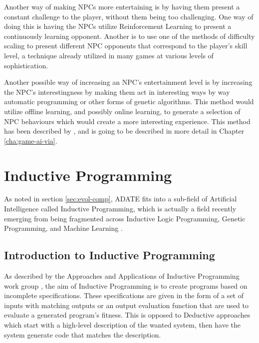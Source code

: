 \documentclass[]{report}
\begin{document}
Another way of making NPCs more entertaining is by having them present a
constant challenge to the player, without them being too challenging. One way of
doing this is having the NPCs utilize Reinforcement Learning
\citep{merrick2006motivated,sutton1998reinforcement} to present a continuously
learning opponent. Another is to use one of the methods of difficulty scaling to
present different NPC opponents that correspond to the player's skill level, a
technique already utilized in many games at various levels of sophistication.

Another possible way of increasing an NPC's entertainment level is by increasing
the NPC's interestingness by making them act in interesting ways by way
automatic programming or other forms of genetic algorithms. This method would
utilize offline learning, and possibly online learning, to generate a selection
of NPC behaviours which would create a more interesting experience. This method
has been described by \citet{yannakakis2005ai}, and is going to be described in
more detail in Chapter \ref{cha:game-ai-via}.

\chapter{Inductive Programming}
\label{cha:induct-progr}

As noted in section \ref{sec:evol-comp}, ADATE \citep{olsson1995inductive} fits
into a sub-field of Artificial Intelligence called Inductive Programming, which is
actually a field recently emerging from being fragmented across Inductive Logic
Programming, Genetic Programming, and Machine Learning
\citep{kitzelmann2010inductive}.

\section{Introduction to Inductive Programming}
\label{sec:intr-induct-progr}

As described by the Approaches and Applications of Inductive Programming work
group \citep{aaip2010intro}, the aim of Inductive Programming is to create
programs based on incomplete specifications. These specifications are given in
the form of a set of inputs with matching outputs or an output evaluation
function that are used to evaluate a generated program's fitness. This is
opposed to Deductive approaches which start with a high-level description of the
wanted system, then have the system generate code that matches the
description.
\end{document}
